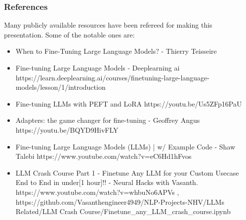 \begin{frame}\frametitle{References}
Many publicly available resources have been refereed for making this presentation. Some of the notable ones are:
\footnotesize
\begin{itemize}
\item When to Fine-Tuning Large Language Models? - Thierry Teisseire
\item Fine-tuning Large Language Models - Deeplearning ai https://learn.deeplearning.ai/courses/finetuning-large-language-models/lesson/1/introduction
\item Fine-tuning LLMs with PEFT and LoRA https://youtu.be/Us5ZFp16PaU
\item Adapters: the game changer for fine-tuning - Geoffrey Angus https://youtu.be/BQYD9HivFLY
\item Fine-tuning Large Language Models (LLMs) | w/ Example Code - Shaw Talebi https://www.youtube.com/watch?v=eC6Hd1hFvos
\item LLM Crash Course Part 1 - Finetune Any LLM for your Custom Usecase End to End in under[1 hour]!! - Neural Hacks with Vasanth. https://www.youtube.com/watch?v=whbuNo6APVs  ,  https://github.com/Vasanthengineer4949/NLP-Projects-NHV/LLMs Related/LLM Crash Course/Finetune\_any\_LLM\_crash\_course.ipynb
\end{itemize}

\end{frame}